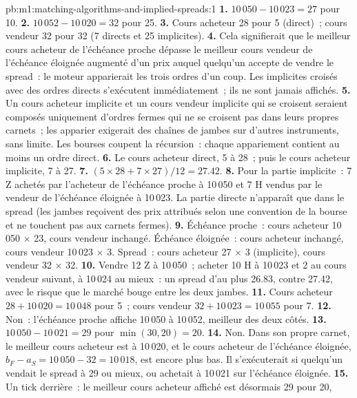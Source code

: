 \begin{solution}{pb:m1:matching-algorithms-and-implied-spreads:1}
\textbf{1.} $10\,050 - 10\,023 = 27$ pour 10.
\textbf{2.} $10\,052 - 10\,020 = 32$ pour 25.
\textbf{3.} Cours acheteur 28 pour 5 (direct)~; cours vendeur 32 pour 32 (7 directs et 25 implicites).
\textbf{4.} Cela signifierait que le meilleur cours acheteur de l'échéance proche dépasse le
meilleur cours vendeur de l'échéance éloignée augmenté d'un prix auquel quelqu'un accepte de
vendre le spread~: le moteur apparierait les trois ordres d'un coup. Les implicites croisés
avec des ordres directs s'exécutent immédiatement~; ils ne sont jamais affichés.
\textbf{5.} Un cours acheteur implicite et un cours vendeur implicite qui se croisent seraient
composés uniquement d'ordres fermes qui ne se croisent pas dans leurs propres carnets~;
les apparier exigerait des chaînes de jambes sur d'autres instruments, sans limite.
Les bourses coupent la récursion~: chaque appariement contient au moins un ordre
direct.
\textbf{6.} Le cours acheteur direct, 5 à 28~; puis le cours acheteur implicite, 7 à 27.
\textbf{7.} $(5 \times 28 + 7 \times 27)/12 = 27.42$.
\textbf{8.} Pour la partie implicite~: 7 Z achetés par l'acheteur de l'échéance proche à
10\,050 et 7 H vendus par le vendeur de l'échéance éloignée à 10\,023. La partie directe
n'apparaît que dans le spread (les jambes reçoivent des prix attribués selon une
convention de la bourse et ne touchent pas aux carnets fermes).
\textbf{9.} Échéance proche~: cours acheteur 10\,050 $\times$ 23, cours vendeur inchangé. Échéance éloignée~: cours acheteur
inchangé, cours vendeur 10\,023 $\times$ 3. Spread~: cours acheteur 27 $\times$ 3 (implicite), cours vendeur 32
$\times$ 32.
\textbf{10.} Vendre 12 Z à 10\,050~; acheter 10 H à 10\,023 et 2 au
cours vendeur suivant, à 10\,024 au mieux~: un spread d'au plus 26.83, contre 27.42, avec le
risque que le marché bouge entre les deux jambes.
\textbf{11.} Cours acheteur $28 + 10\,020 = 10\,048$ pour 5~; cours vendeur $32 + 10\,023 = 10\,055$ pour
7.
\textbf{12.} Non~: l'échéance proche affiche 10\,050 à 10\,052, meilleur des deux
côtés.
\textbf{13.} $10\,050 - 10\,021 = 29$ pour $\min(30, 20) = 20$.
\textbf{14.} Non. Dans son propre carnet, le meilleur cours acheteur est à 10\,020, et le
cours acheteur  de l'échéance éloignée, $b_F - a_S = 10\,050 - 32 = 10\,018$, est encore plus bas. Il s'exécuterait
si quelqu'un vendait le spread à 29 ou mieux, ou achetait à 10\,021 sur l'échéance éloignée.
\textbf{15.} Un tick derrière~: le meilleur cours acheteur affiché est désormais 29 pour 20,

\end{solution}
